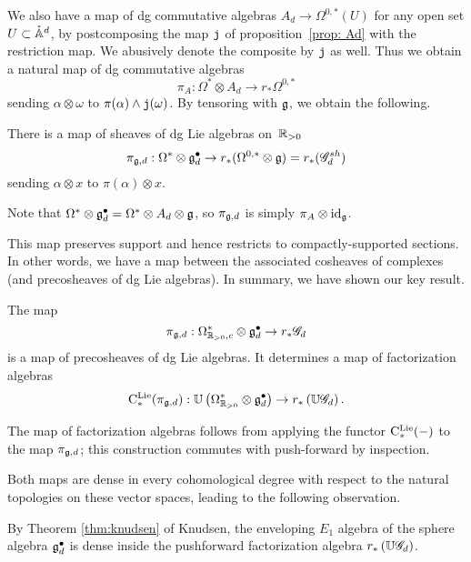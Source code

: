 We also have a map of dg commutative algebras $A_d \to \Omega^{0,*}(U)$ for any open set $U \subset \mathring{\mathbb A}^d$,
by postcomposing the map ${\mathtt{j}}$ of proposition~\ref{prop: Ad} with the restriction map.
We abusively denote the composite by ${\mathtt{j}}$ as well.
Thus we obtain a natural map of dg commutative algebras
\[
\pi_A: \Omega^* \otimes A_d \to r_* \Omega^{0,*}
\]
sending $\alpha \otimes \omega$ to $\pi(\alpha) \wedge {\mathtt{j}}(\omega)$.
By tensoring with $\mathfrak g$, we obtain the following.

\begin{cor}
There is a map of sheaves of dg Lie algebras on~$\mathbb R_{>0}$
\[
\pi_{\mathfrak g, d}: \Omega^* \otimes \mathfrak g^\bullet_d \to r_* (\Omega^{0,*}\otimes \mathfrak g) = r_*(\mathscr G_d^{sh})
\]
sending $\alpha \otimes x$ to $\pi(\alpha) \otimes x$.
\end{cor}

Note that $\Omega^* \otimes \mathfrak g^\bullet_d = \Omega^* \otimes A_d \otimes \mathfrak g$, so $\pi_{\mathfrak g, d}$ is simply $\pi_A \otimes {\rm id}_\mathfrak g$.

This map preserves support and hence restricts to compactly-supported sections.
In other words, we have a map between the associated cosheaves of complexes (and precosheaves of dg Lie algebras).
In summary, we have shown our key result.

\begin{prop}
\label{prop: fact lie}
The map
\[
\pi_{\mathfrak g, d}: \Omega^*_{\mathbb R_{>0},c} \otimes \mathfrak g^\bullet_d \to r_*\mathscr G_d 
\] 
is a map of precosheaves of dg Lie algebras.
It determines a map of factorization algebras
\[
{\rm C}^{\rm Lie}_*(\pi_{\mathfrak g, d}) : \mathbb U\left(\Omega^{*}_{\mathbb R_{>0}} \otimes \mathfrak g^\bullet_d\right) \to r_*\left(\mathbb U \mathscr G_d \right) .
\]
\end{prop}

The map of factorization algebras follows from applying the functor ${\rm C}^{\rm Lie}_*(-)$ to the map $\pi_{\mathfrak g, d}$;
this construction commutes with push-forward by inspection. 

Both maps are dense in every cohomological degree with respect to the natural topologies on these vector spaces,
leading to the following observation.


\begin{cor}
By Theorem \ref{thm:knudsen} of Knudsen, 
the enveloping $E_1$ algebra of the sphere algebra $\mathfrak g^\bullet_d$ is dense inside the pushforward factorization algebra $r_*\left(\mathbb U \mathscr G_d \right)$.
\end{cor}


